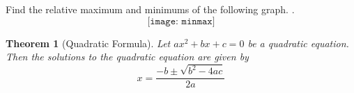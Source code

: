 \documentclass[addpoints,12pt]{exam}
\newtheorem{theorem}{Theorem}
\begin{document}
\begin{questions}
\newpage

\question Find the relative maximum and minimums of the following graph. . 
\[  \texttt{[image: minmax]}\] \vfill


\begin{comment}
\question Give an example of an even function, and verify that it is an even function. 
\end{comment}

\begin{comment}
\question Evaluate the following piecewise function at the following values
\[
	f(x) =
	\begin{cases}
   x+4 & x\leq -3 \\
	 -x+2 & x> -3 \\
	\end{cases}
\]

\begin{enumerate}[label = \alph*)]
    \item $f(-5)=$
		\item $f(-3) = $
		\item $f(-1)= $
		\item $f(0)=$
\end{enumerate}
\end{comment}

\end{questions}

\begin{theorem}[Quadratic Formula]
    Let $ax^{2}+bx +c =0$ be a quadratic equation. Then the solutions to the quadratic equation are given by 
		\[
			x = \frac{-b \pm \sqrt{b^{2} - 4ac}}{2a}
		\]
\end{theorem} \vfill
\end{document}
